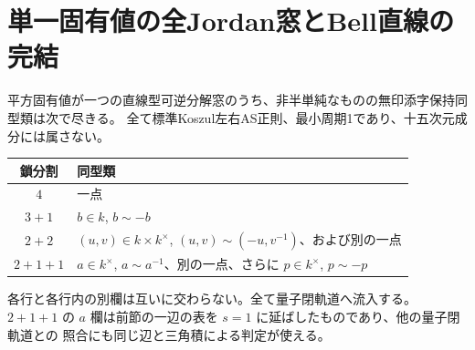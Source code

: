 \section{単一固有値の全Jordan窓とBell直線の完結}
\label{sec:split-single-eigenvalue-jordan}
\begin{theorem}\label{thm:split-single-eigenvalue-jordan}
平方固有値が一つの直線型可逆分解窓のうち、非半単純なものの無印添字保持同型類は次で尽きる。
全て標準Koszul左右AS正則、最小周期1であり、十五次元成分には属さない。
\begin{center}
\begin{tabular}{cl}
鎖分割 & 同型類\\\hline
$4$ & 一点\\
$3+1$ & $b\in k$, $b\sim-b$\\
$2+2$ & $(u,v)\in k\times k^\times$, $(u,v)\sim(-u,v^{-1})$、および別の一点\\
$2+1+1$ & $a\in k^\times$, $a\sim a^{-1}$、別の一点、さらに $p\in k^\times$, $p\sim-p$
\end{tabular}
\end{center}
各行と各行内の別欄は互いに交わらない。全て量子閉軌道へ流入する。
$2+1+1$ の $a$ 欄は前節の一辺の表を $s=1$ に延ばしたものであり、他の量子閉軌道との
照合にも同じ辺と三角積による判定が使える。
\end{theorem}

